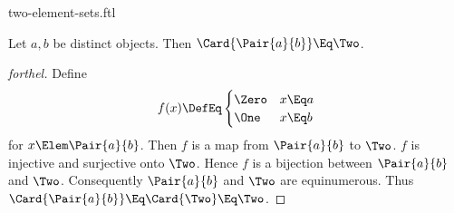 \documentclass{stex}
\begin{document}
\begin{smodule}{two-element-sets.ftl}


\begin{proposition*}[forthel]
  Let $a, b$ be distinct objects.
  Then $\Card{\Pair{a}{b}} \Eq \Two$.
\end{proposition*}
\begin{proof}[forthel]
  Define \[ f(x) \DefEq
    \begin{cases}
      \Zero  & x \Eq a
      \\
      \One   & x \Eq b
    \end{cases} \]
  for $x \Elem \Pair{a}{b}$.
  Then $f$ is a map from $\Pair{a}{b}$ to $\Two$.
  $f$ is injective and surjective onto $\Two$.
  Hence $f$ is a bijection between $\Pair{a}{b}$ and $\Two$.
  Consequently $\Pair{a}{b}$ and $\Two$ are equinumerous.
  Thus $\Card{\Pair{a}{b}} \Eq \Card{\Two} \Eq \Two$.
\end{proof}

\end{smodule}
\end{document}
